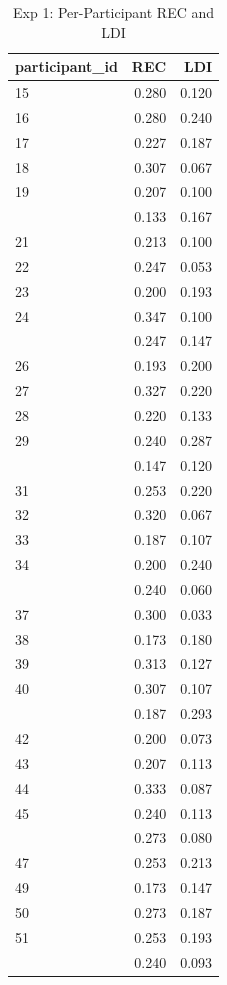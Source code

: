 \documentclass[
]{article}
\begin{document}
\begingroup\fontsize{12}{14}\selectfont

\begin{longtable}[t]{lrr}
\caption{\label{tab:exp1_rec_ldi}Exp 1: Per-Participant REC and LDI}\\
\toprule
participant\_id & REC & LDI\\
\midrule
15 & 0.280 & 0.120\\
16 & 0.280 & 0.240\\
17 & 0.227 & 0.187\\
18 & 0.307 & 0.067\\
19 & 0.207 & 0.100\\
\addlinespace
20 & 0.133 & 0.167\\
21 & 0.213 & 0.100\\
22 & 0.247 & 0.053\\
23 & 0.200 & 0.193\\
24 & 0.347 & 0.100\\
\addlinespace
25 & 0.247 & 0.147\\
26 & 0.193 & 0.200\\
27 & 0.327 & 0.220\\
28 & 0.220 & 0.133\\
29 & 0.240 & 0.287\\
\addlinespace
30 & 0.147 & 0.120\\
31 & 0.253 & 0.220\\
32 & 0.320 & 0.067\\
33 & 0.187 & 0.107\\
34 & 0.200 & 0.240\\
\addlinespace
36 & 0.240 & 0.060\\
37 & 0.300 & 0.033\\
38 & 0.173 & 0.180\\
39 & 0.313 & 0.127\\
40 & 0.307 & 0.107\\
\addlinespace
41 & 0.187 & 0.293\\
42 & 0.200 & 0.073\\
43 & 0.207 & 0.113\\
44 & 0.333 & 0.087\\
45 & 0.240 & 0.113\\
\addlinespace
46 & 0.273 & 0.080\\
47 & 0.253 & 0.213\\
49 & 0.173 & 0.147\\
50 & 0.273 & 0.187\\
51 & 0.253 & 0.193\\
\addlinespace
52 & 0.240 & 0.093\\

\end{longtable}
\end{document}
